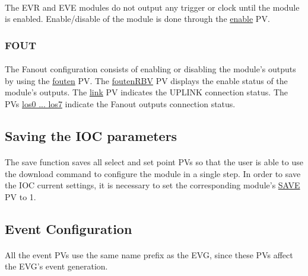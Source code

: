 \documentclass[openany]{article}
\begin{document}
			\paragraph{} The EVR and EVE modules do not output any trigger or clock until the module is enabled. Enable/disable of the module is done through the \hyperref[pvgroup:evg-control-status]{enable} PV.

		\subsubsection{FOUT}

			\paragraph{} The Fanout configuration consists of enabling or disabling the module's outputs by using the \hyperref[pvgroup:fout-control-status]{fouten} PV. The \hyperref[pvgroup:fout-control-status]{foutenRBV} PV displays the enable status of the module's outputs. The \hyperref[pvgroup:fout-control-status]{link} PV indicates the UPLINK connection status. The PVs \hyperref[pvgroup:fout-control-status]{los0 ... los7} indicate the Fanout outputs connection status.

	\subsection{Saving the IOC parameters}
		\paragraph{} The save function saves all select and set point PVs so that the user is able to use the download command to configure the module in a single step. In order to save the IOC current settings, it is necessary to set the corresponding module's \hyperref[pvgroup:evg-module-support]{SAVE} PV to 1.

	\subsection{Event Configuration}
		\paragraph{} All the event PVs use the same name prefix as the EVG, since these PVs affect the EVG's event generation.
\end{document}
